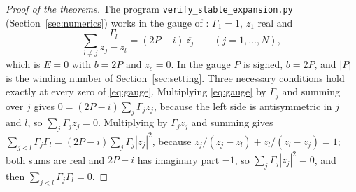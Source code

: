 \documentclass[11pt]{article}
\theoremstyle{definition}
\begin{document}
\begin{proof}[Proof of the theorems]
The program \texttt{verify\_\allowbreak stable\_\allowbreak expansion.py} (Section~\ref{sec:numerics}) works in the gauge of \cite[Sect.~8]{mw2026}: $\Gamma_1 = 1$, $z_1$ real and
\begin{equation}\label{eq:gauge}
  \sum_{l \ne j}\frac{\Gamma_l}{z_j - z_l} = (2P - i)\,\overline{z_j}\qquad(j = 1, \ldots, N),
\end{equation}
which is $E = 0$ with $b = 2P$ and $z_c = 0$. In the gauge $P$ is signed, $b = 2P$, and $|P|$ is the winding number of Section~\ref{sec:setting}. Three necessary conditions hold exactly at every zero of \eqref{eq:gauge}. Multiplying \eqref{eq:gauge} by $\Gamma_j$ and summing over $j$ gives $0 = (2P - i)\sum_j\Gamma_j\overline{z_j}$, because the left side is antisymmetric in $j$ and $l$, so $\sum_j\Gamma_jz_j = 0$. Multiplying by $\Gamma_jz_j$ and summing gives $\sum_{j<l}\Gamma_j\Gamma_l = (2P - i)\sum_j\Gamma_j|z_j|^2$, because $z_j/(z_j - z_l) + z_l/(z_l - z_j) = 1$; both sums are real and $2P - i$ has imaginary part $-1$, so $\sum_j\Gamma_j|z_j|^2 = 0$, and then $\sum_{j<l}\Gamma_j\Gamma_l = 0$.


\end{proof}
\end{document}
